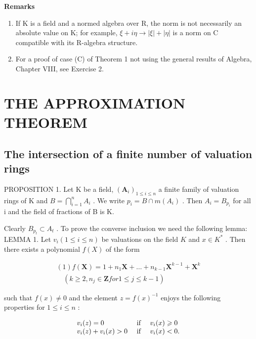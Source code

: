 \textbf{Remarks}\par

\begin{enumerate}
\def\labelenumi{(\arabic{enumi})}
\setcounter{enumi}{1}
\item
  If K is a field and a normed algebra over R, the norm is not necessarily an absolute value on K; for example, \(\xi + i\eta \to |\xi| + |\eta|\) is a norm on C compatible with its R-algebra structure.
\item
  For a proof of case (C) of Theorem 1 not using the general results of Algebra, Chapter VIII, see Exercise 2.
\end{enumerate}

\section{THE APPROXIMATION THEOREM}

\subsection{The intersection of a finite number of valuation rings}

PROPOSITION 1. Let K be a field, \((\mathbf{A}_{i})_{1 \leqslant i \leqslant n}\) a finite family of valuation rings of K and \(B = \bigcap_{i=1}^{n} A_{i}\) . We write \(p_{i} = B \cap m(A_{i})\) . Then \(A_{i} = B_{p_{i}}\) for all i and the field of fractions of B is K.

Clearly \(B_{p_t} \subset A_t\) . To prove the converse inclusion we need the following lemma: LEMMA 1. Let \(v_i (1 \leqslant i \leqslant n)\) be valuations on the field \(K\) and \(x \in K^*\) . Then there exists a polynomial \(f(X)\) of the form

\[
\begin{array}{l} (1) f (\mathbf {X}) = 1 + n _ {1} \mathbf {X} + \dots + n _ {k - 1} \mathbf {X} ^ {k - 1} + \mathbf {X} ^ {k} \\ \quad (k \geqslant 2, n _ {j} \in \mathbf {Z} for 1 \leqslant j \leqslant k - 1) \end{array}
\]

such that \(f(x) \neq 0\) and the element \(z = f(x)^{-1}\) enjoys the following properties for \(1 \leqslant i \leqslant n\) :

\[
\begin{array}{l l} v _ {i} (z) = 0 & \text { if } \quad v _ {i} (x) \geqslant 0 \\ v _ {i} (z) + v _ {i} (x) > 0 & \text { if } \quad v _ {i} (x) <   0. \end{array}
\]


